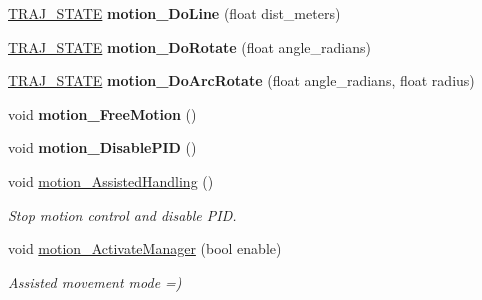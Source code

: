 \begin{DoxyCompactItemize}
\item 
\mbox{\label{classAsservDriver_a4ac101bd479baeecf76fd0d6be63421d}} 
\hyperlink{path__manager_8h_adb3360abeb29758da93865c8afcb80eb}{T\+R\+A\+J\+\_\+\+S\+T\+A\+TE} {\bfseries motion\+\_\+\+Do\+Line} (float dist\+\_\+meters)
\item 
\mbox{\label{classAsservDriver_aca1011c3fb10e594e836ea4ada6b92ff}} 
\hyperlink{path__manager_8h_adb3360abeb29758da93865c8afcb80eb}{T\+R\+A\+J\+\_\+\+S\+T\+A\+TE} {\bfseries motion\+\_\+\+Do\+Rotate} (float angle\+\_\+radians)
\item 
\mbox{\label{classAsservDriver_aabc36af66a38e2fb735e764730328994}} 
\hyperlink{path__manager_8h_adb3360abeb29758da93865c8afcb80eb}{T\+R\+A\+J\+\_\+\+S\+T\+A\+TE} {\bfseries motion\+\_\+\+Do\+Arc\+Rotate} (float angle\+\_\+radians, float radius)
\item 
\mbox{\label{classAsservDriver_aac603258c40d4c9aede0e5fce6ed4dea}} 
void {\bfseries motion\+\_\+\+Free\+Motion} ()
\item 
\mbox{\label{classAsservDriver_a0a68a702d1fea277c2e24e6dceb2d646}} 
void {\bfseries motion\+\_\+\+Disable\+P\+ID} ()
\item 
\mbox{\label{classAsservDriver_a733d0cddfdb612cea9e8097b348537f1}} 
void \hyperlink{classAsservDriver_a733d0cddfdb612cea9e8097b348537f1}{motion\+\_\+\+Assisted\+Handling} ()
\begin{DoxyCompactList}\small\item\em Stop motion control and disable P\+ID. \end{DoxyCompactList}\item 
\mbox{\label{classAsservDriver_aaeb3c80c8a079c812af38273f825c537}} 
void \hyperlink{classAsservDriver_aaeb3c80c8a079c812af38273f825c537}{motion\+\_\+\+Activate\+Manager} (bool enable)
\begin{DoxyCompactList}\small\item\em Assisted movement mode =) \end{DoxyCompactList}\item 
\mbox{\label{classAsservDriver_a788b3e067b54d81241f3cafde73019c3}} 

\end{DoxyCompactItemize}
